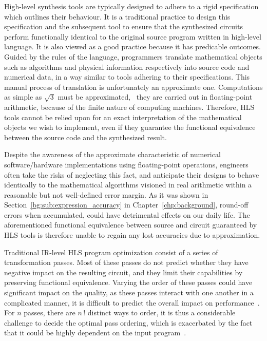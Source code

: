 High-level synthesis tools are typically designed to adhere to a rigid
specification which outlines their behaviour.  It is a traditional practice
to design this specification and the subsequent tool to ensure that the
synthesized circuits perform functionally identical to the original source
program written in high-level language.  It is also viewed as a good practice
because it has predicable outcomes.  Guided by the rules of the language,
programmers translate mathematical objects such as algorithms and physical
information respectively into source code and numerical data, in a way similar
to tools adhering to their specifications.  This manual process of translation
is unfortunately an approximate one.  Computations as simple as $\sqrt{3}$ must
be approximated, \eg~they are carried out in floating-point arithmetic, because
of the finite nature of computing machines.  Therefore, HLS tools cannot be
relied upon for an exact interpretation of the mathematical objects we wish
to implement, even if they guarantee the functional equivalence between the
source code and the synthesized result.

Despite the awareness of the approximate characteristic of numerical
software/hardware implementations using floating-point operations, engineers
often take the risks of neglecting this fact, and anticipate their designs to
behave identically to the mathematical algorithms visioned in real arithmetic
within a reasonable but not well-defined error margin.  As it was shown in
Section~\ref{bg:sub:expression_accuracy} in Chapter~\ref{chp:background},
round-off errors when accumulated, could have detrimental effects on our daily
life.  The aforementioned functional equivalence between source and circuit
guaranteed by HLS tools is therefore unable to regain any lost accuracies due
to approximation.

Traditional IR-level HLS program optimization consist of a series of
transformation passes.  Most of these passes do not predict whether they have
negative impact on the resulting circuit, and they limit their capabilities by
preserving functional equivalence.  Varying the order of these passes could
have significant impact on the quality, as these passes interact with one
another in a complicated manner, it is difficult to predict the overall impact
on performance~\cite{huang15}.  For $n$ passes, there are $n{\,!}$ distinct
ways to order, it is thus a considerable challenge to decide the optimal pass
ordering, which is exacerbated by the fact that it could be highly dependent on
the input program~\cite{cong13}.

